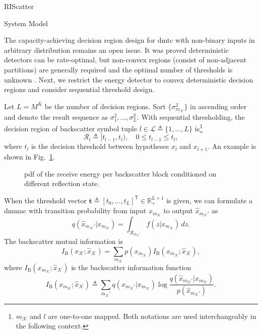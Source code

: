 \begin{section}{RIScatter}
\begin{subsection}{System Model}
		\begin{remark}
			The capacity-achieving decision region design for \gls{dmtc} with non-binary inputs in arbitrary distribution remains an open issue.
			It was proved deterministic detectors can be rate-optimal, but non-convex regions (consist of non-adjacent partitions) are generally required and the optimal number of thresholds is unknown \cite{Nguyen2018,Nguyen2021}.
			Next, we restrict the energy detector to convex deterministic decision regions and consider sequential threshold design.
		\end{remark}

		Let $L = M^K$ be the number of decision regions.
		Sort $\{\sigma_{m_{\mathcal{K}}}^2\}$ in ascending order and denote the result sequence as $\sigma_1^2,\ldots,\sigma_L^2$.
		With sequential thresholding, the decision region of backscatter symbol tuple $l \in \mathcal{L} \triangleq \{1,\ldots,L\}$ is\footnote{$m_{\mathcal{K}}$ and $l$ are one-to-one mapped. Both notations are used interchangeably in the following context.}
		\begin{equation}
			\mathcal{R}_{l} \triangleq [t_{l-1},t_l), \quad 0 \le t_{l-1} \le t_l,
		\end{equation}
		where $t_l$ is the decision threshold between hypotheses $x_{l}$ and $x_{l+1}$.
		An example is shown in Fig.~\ref{fg:energy_distribution}.

		\begin{figure}[!t]
			\centering
			\resizebox{0.8\columnwidth}{!}{
				
			}
			\caption{
				\gls{pdf} of the receive energy per backscatter block conditioned on different reflection state.
			}
			\label{fg:energy_distribution}
		\end{figure}

		When the threshold vector $\boldsymbol{t} \triangleq [t_0,\ldots,t_L]^\mathsf{T} \in \mathbb{R}_+^{L+1}$ is given, we can formulate a \gls{dmmac} with transition probability from input $x_{m_{\mathcal{K}}}$ to output $\hat{x}_{m_{\mathcal{K}}'}$ as
		\begin{equation}
			q(\hat{x}_{m_{\mathcal{K}}'}|x_{m_{\mathcal{K}}}) = \int_{\mathcal{R}_{m_{\mathcal{K}}'}} f(z|x_{m_{\mathcal{K}}}) \, d z.
			\label{eq:dmmac}
		\end{equation}
		The backscatter mutual information is
		\begin{equation}
			I_{\text{B}}(x_{\mathcal{K}};\hat{x}_{\mathcal{K}}) = \sum_{m_{\mathcal{K}}} p(x_{m_{\mathcal{K}}}) I_{\text{B}}(x_{m_{\mathcal{K}}};\hat{x}_{\mathcal{K}}),
			\label{eq:backscatter_mutual_information}
		\end{equation}
		where $I_{\text{B}}(x_{m_{\mathcal{K}}};\hat{x}_{\mathcal{K}})$ is the backscatter information function
		\begin{equation}
			I_{\text{B}}(x_{m_{\mathcal{K}}};\hat{x}_{\mathcal{K}}) \triangleq \sum_{m_{\mathcal{K}}'} q(\hat{x}_{m_{\mathcal{K}}'}|x_{m_{\mathcal{K}}}) \log \frac{q(\hat{x}_{m_{\mathcal{K}}'}|x_{m_{\mathcal{K}}})}{p(\hat{x}_{m_{\mathcal{K}}'})}.
			\label{eq:backscatter_information_function}
		\end{equation}


\end{subsection}
\end{section}
